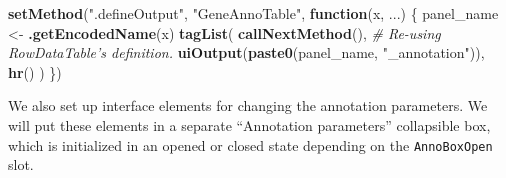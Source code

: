 \documentclass[
]{book}
\newenvironment{Shaded}{\begin{snugshade}}{\end{snugshade}}
\newcommand{\CommentTok}[1]{\textcolor[rgb]{0.56,0.35,0.01}{\textit{#1}}}
\newcommand{\ControlFlowTok}[1]{\textcolor[rgb]{0.13,0.29,0.53}{\textbf{#1}}}
\newcommand{\KeywordTok}[1]{\textcolor[rgb]{0.13,0.29,0.53}{\textbf{#1}}}
\newcommand{\NormalTok}[1]{#1}
\newcommand{\StringTok}[1]{\textcolor[rgb]{0.31,0.60,0.02}{#1}}
\begin{document}
\begin{Shaded}
\begin{Highlighting}[]
\KeywordTok{setMethod}\NormalTok{(}\StringTok{".defineOutput"}\NormalTok{, }\StringTok{"GeneAnnoTable"}\NormalTok{, }\ControlFlowTok{function}\NormalTok{(x, ...) \{}
\NormalTok{    panel_name <-}\StringTok{ }\KeywordTok{.getEncodedName}\NormalTok{(x)}
    \KeywordTok{tagList}\NormalTok{(}
        \KeywordTok{callNextMethod}\NormalTok{(), }\CommentTok{# Re-using RowDataTable's definition.}
        \KeywordTok{uiOutput}\NormalTok{(}\KeywordTok{paste0}\NormalTok{(panel_name, }\StringTok{"_annotation"}\NormalTok{)),}
        \KeywordTok{hr}\NormalTok{()}
\NormalTok{    )}
\NormalTok{\})}
\end{Highlighting}
\end{Shaded}

We also set up interface elements for changing the annotation parameters.
We will put these elements in a separate ``Annotation parameters'' collapsible box,
which is initialized in an opened or closed state depending on the \texttt{AnnoBoxOpen} slot.
\end{document}
